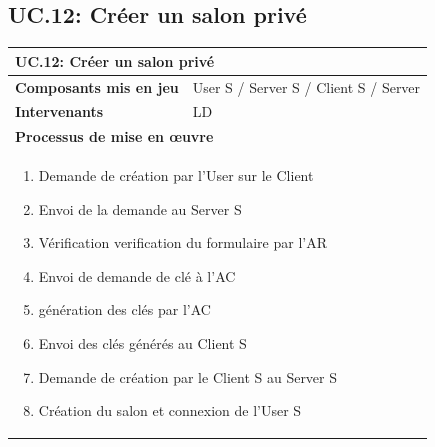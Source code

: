 \documentclass[a4paper,11pt,french]{article}
\begin{document}

\subsection{UC.12: Créer un salon privé}
\begin{center}
	\vspace*{0.7cm}
	\begin{tabularx}{16cm}{|l|X|}
	\hline
	\multicolumn{2}{|l|}{\textbf{UC.12: Créer un salon privé}}\\
	\hline
	\textbf{Composants mis en jeu} & User S / Server S / Client S / Server \\
	\hline
	\textbf{Intervenants} & LD \\
	\hline
	\multicolumn{2}{|l|}{\textbf{Processus de mise en \oe uvre}}\\
	\hline
	\multicolumn{2}{|p{15cm}|}{\begin{enumerate}\item Demande de création par l'User sur le Client \item Envoi de la demande au Server S \item Vérification verification du formulaire par l'AR \item Envoi de demande de clé à l'AC \item génération des clés par l'AC \item Envoi des clés générés au Client S \item Demande de création par le Client S au Server S \item Création du salon et connexion de l'User S \end{enumerate}}\\
	\hline
	\end{tabularx}
\end{center}
\end{document}
